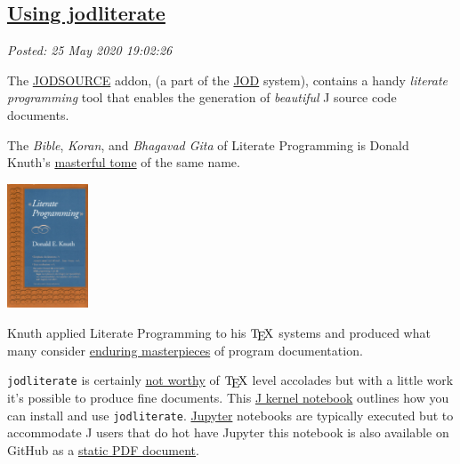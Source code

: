 %

\subsection*{\href{https://analyzethedatanotthedrivel.org/2020/05/25/using-jodliterate/}{Using jodliterate}}

\noindent\emph{Posted: 25 May 2020 19:02:26}
\vspace{6pt}

The
\href{https://code.jsoftware.com/wiki/Addons/general/jodsource}{JODSOURCE}
addon, (a part of the
\href{https://code.jsoftware.com/wiki/Addons/general/jod}{JOD} system),
contains a handy \emph{literate programming} tool that enables the
generation of \emph{beautiful} J source code documents.

The \emph{Bible}, \emph{Koran}, and \emph{Bhagavad Gita} of Literate
Programming is Donald Knuth's
\href{https://www.goodreads.com/book/show/112245.Literate_Programming}{masterful
tome} of the same name.


\captionsetup[floatingfigure]{labelformat=empty}
\begin{floatingfigure}[l]{0.22\textwidth}
\centering
\includegraphics[width=0.18\textwidth]{inclusions/literate_programming_book_cover_smaller.png}
\end{floatingfigure}Knuth applied Literate Programming to his \(\TeX\) systems and produced
what many consider
\href{https://www.amazon.com/TeXbook-Donald-Knuth/dp/0201134489\#customerReviews}{enduring
masterpieces} of program documentation.

\texttt{jodliterate} is certainly
\href{https://www.youtube.com/watch?v=o5FT3IGXtAk}{not worthy} of
\(\TeX\) level accolades but with a little work it's possible to produce
fine documents. This \href{https://github.com/martin-saurer/jkernel}{J
kernel notebook} outlines how you can install and use
\texttt{jodliterate}. \href{https://jupyter.org/}{Jupyter} notebooks are
typically executed but to accommodate J users that do hot have Jupyter
this notebook is also available on GitHub as a
\href{https://github.com/bakerjd99/jacks/blob/master/jodliterate/UsingJodliterate.pdf}{static
PDF document}.

